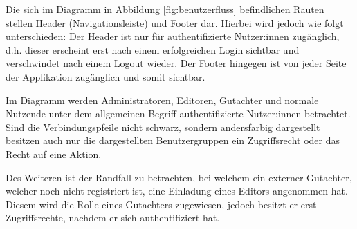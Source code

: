 Die sich im Diagramm in Abbildung \ref{fig:benutzerfluss} befindlichen Rauten stellen Header (Navigationsleiste) und Footer dar.
Hierbei wird jedoch wie folgt unterschieden: Der Header ist nur für authentifizierte Nutzer:innen zugänglich,
d.h. dieser erscheint erst nach einem erfolgreichen Login sichtbar und verschwindet nach einem Logout wieder.
Der Footer hingegen ist von jeder Seite der Applikation zugänglich und somit sichtbar.

Im Diagramm werden Administratoren, Editoren, Gutachter und normale Nutzende unter dem allgemeinen Begriff
authentifizierte Nutzer:innen betrachtet.
Sind die Verbindungspfeile nicht schwarz, sondern andersfarbig dargestellt besitzen auch nur die
dargestellten Benutzergruppen ein Zugriffsrecht oder das Recht auf eine Aktion.

Des Weiteren ist der Randfall zu betrachten, bei welchem ein externer Gutachter, welcher noch nicht registriert ist,
eine Einladung eines Editors angenommen hat.
Diesem wird die Rolle eines Gutachters zugewiesen, jedoch besitzt er erst Zugriffsrechte, nachdem er sich
authentifiziert hat.